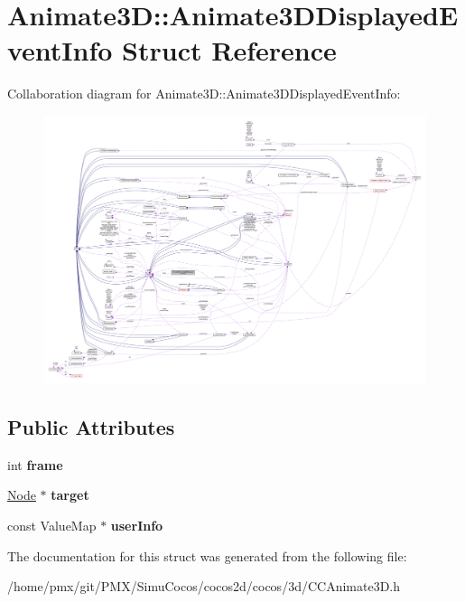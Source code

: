 \hypertarget{structAnimate3D_1_1Animate3DDisplayedEventInfo}{}\section{Animate3D\+:\+:Animate3\+D\+Displayed\+Event\+Info Struct Reference}
\label{structAnimate3D_1_1Animate3DDisplayedEventInfo}


Collaboration diagram for Animate3D\+:\+:Animate3\+D\+Displayed\+Event\+Info\+:
\nopagebreak
\begin{figure}[H]
\begin{center}
\leavevmode
\includegraphics[width=350pt]{structAnimate3D_1_1Animate3DDisplayedEventInfo__coll__graph}
\end{center}
\end{figure}
\subsection*{Public Attributes}
\begin{DoxyCompactItemize}
\item 
\mbox{\label{structAnimate3D_1_1Animate3DDisplayedEventInfo_a734741d50d5f6eacb0ef1c07de473199}} 
int {\bfseries frame}
\item 
\mbox{\label{structAnimate3D_1_1Animate3DDisplayedEventInfo_ab388b2d14a536c9d2ebdd7f9afa07606}} 
\hyperlink{classNode}{Node} $\ast$ {\bfseries target}
\item 
\mbox{\label{structAnimate3D_1_1Animate3DDisplayedEventInfo_ac7ded72e4d97084257dc39d4538fb873}} 
const Value\+Map $\ast$ {\bfseries user\+Info}
\end{DoxyCompactItemize}


The documentation for this struct was generated from the following file\+:\begin{DoxyCompactItemize}
\item 
/home/pmx/git/\+P\+M\+X/\+Simu\+Cocos/cocos2d/cocos/3d/C\+C\+Animate3\+D.\+h\end{DoxyCompactItemize}
